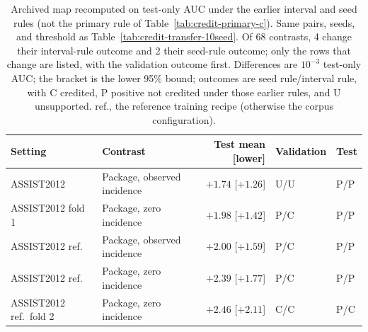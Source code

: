 \begin{table}[tbp]
\caption{Archived map recomputed on test-only AUC under the earlier
interval and seed rules (not the primary rule of
Table~\ref{tab:credit-primary-c}). Same pairs, seeds, and threshold as
Table~\ref{tab:credit-transfer-10seed}. Of 68 contrasts, 4 change their
interval-rule outcome and 2 their seed-rule outcome; only the rows that
change are listed, with the validation outcome first. Differences are
$10^{-3}$ test-only AUC; the bracket is the lower 95\% bound; outcomes
are seed rule/interval rule, with C credited, P positive not credited
under those earlier rules, and U unsupported. ref., the reference
training recipe (otherwise the corpus configuration).}
\label{tab:credit-test-10seed}
\centering
\scriptsize
\setlength{\tabcolsep}{3pt}
\begin{tabular}{@{}llrll@{}}
\toprule
Setting & Contrast & Test mean [lower] & Validation & Test \\
\midrule
ASSIST2012 & Package, observed incidence & $+1.74$ [$+1.26$] & U/U & P/P \\
ASSIST2012 fold 1 & Package, zero incidence & $+1.98$ [$+1.42$] & P/C & P/P \\
ASSIST2012 ref. & Package, observed incidence & $+2.00$ [$+1.59$] & P/C & P/P \\
ASSIST2012 ref. & Package, zero incidence & $+2.39$ [$+1.77$] & P/C & P/P \\
ASSIST2012 ref.\ fold 2 & Package, zero incidence & $+2.46$ [$+2.11$] & C/C & P/C \\
\bottomrule
\end{tabular}
\end{table}
